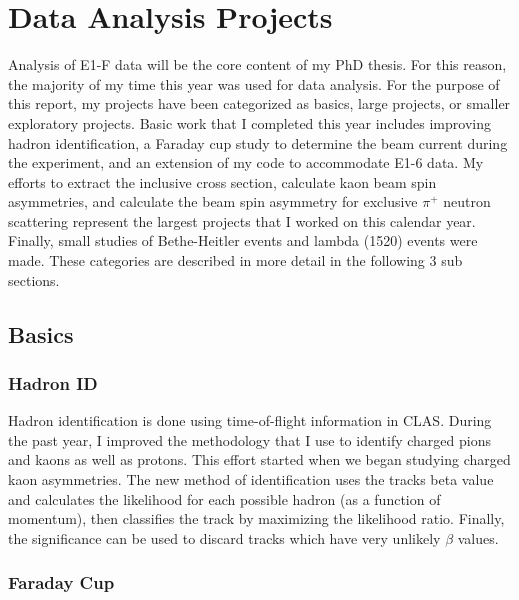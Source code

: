%
%
\section{Data Analysis Projects}
Analysis of E1-F data will be the core content of my PhD thesis.  For this reason, the majority of my time this year was used for data analysis.  For the purpose of this report, my projects have been categorized as basics, large projects, or smaller exploratory projects.  Basic work that I completed this year includes improving hadron identification, a Faraday cup study to determine the beam current during the experiment, and an extension of my code to accommodate E1-6 data.  My efforts to extract the inclusive cross section, calculate kaon beam spin asymmetries, and calculate the beam spin asymmetry for exclusive $\pi^+$ neutron scattering represent the largest projects that I worked on this calendar year.  Finally, small studies of Bethe-Heitler events and lambda (1520) events were made.  These categories are described in more detail in the following 3 sub sections.  

\subsection{Basics}

\subsubsection{Hadron ID}
Hadron identification is done using time-of-flight information in CLAS.  During the past year, I improved the methodology that I use to identify charged pions and kaons as well as protons.  This effort started when we began studying charged kaon asymmetries.  The new method of identification uses the tracks beta value and calculates the likelihood for each possible hadron (as a function of momentum), then classifies the track by maximizing the likelihood ratio.  Finally, the significance can be used to discard tracks which have very unlikely $\beta$ values.  

\subsubsection{Faraday Cup}

